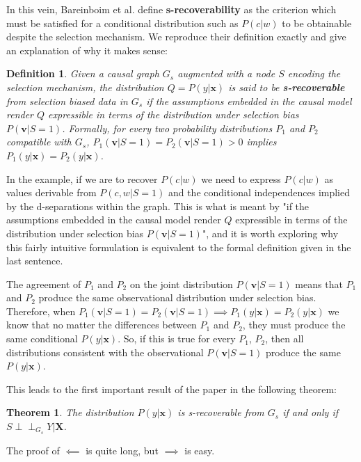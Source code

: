\documentclass[12pt,twoside]{reedthesis}
\newtheorem{theorem}{Theorem}
\newtheorem{definition}{Definition}[section]
\theoremstyle{definition}
\newcommand{\dsep}{\perp \!\!\!\perp}
\begin{document}
In this vein, Bareinboim et al. define \textbf{s-recoverability} as the criterion which must be satisfied for a conditional distribution such as $P(c|w)$ to be obtainable despite the selection mechanism. We reproduce their definition exactly and give an explanation of why it makes sense:

\begin{definition}
Given a causal graph $G_s$ augmented with a node $S$ encoding the selection mechanism, the distribution $Q = P(y | \mathbf{x})$ is said to be \textbf{s-recoverable} from selection biased data in $G_s$ if the assumptions embedded in the causal model render $Q$ expressible in terms of the distribution under selection bias $P(\mathbf{v} | S = 1)$. Formally, for every two probability distributions $P_1$ and $P_2$ compatible with $G_s$, $P_1(\mathbf{v} | S = 1) = P_2(\mathbf{v} | S = 1) > 0$ implies $P_1(y | \mathbf{x}) = P_2(y | \mathbf{x})$.
\end{definition}

In the example, if we are to recover $P(c | w)$  we need to express $P(c | w)$ as values derivable from $P(c, w | S = 1)$ and the conditional independences implied by the d-separations within the graph. This is what is meant by "if the assumptions embedded in the causal model render $Q$ expressible in terms of the distribution under selection bias $P(\mathbf{v} | S = 1)$", and it is worth exploring why this fairly intuitive formulation is equivalent to the formal definition given in the last sentence.

The agreement of $P_1$ and $P_2$ on the joint distribution $P(\mathbf{v} | S = 1)$ means that $P_1$ and $P_2$ produce the same observational distribution under selection bias. Therefore, when $P_1(\mathbf{v} | S = 1) = P_2(\mathbf{v} | S = 1) \implies P_1(y | \mathbf{x}) = P_2(y | \mathbf{x})$ we know that no matter the differences between $P_1$ and $P_2$, they must produce the same conditional $P(y|\mathbf{x})$. So, if this is true for every $P_1$, $P_2$, then all distributions consistent with the observational $P(\mathbf{v} | S = 1)$ produce the same $P(y | \mathbf{x})$. 

This leads to the first important result of the paper in the following theorem:

\begin{theorem}
The distribution $P(y | \mathbf{x})$ is s-recoverable from $G_s$ if and only if $S \dsep_{G_s} Y | \mathbf{X}$.
\end{theorem}

The proof of $\impliedby$ is quite long, but $\implies$ is easy. 
\end{document}
